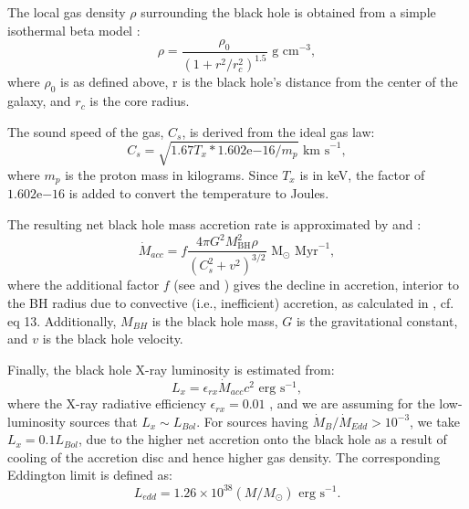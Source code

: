 \documentclass[fleqn,usenatbib,useAMS]{mnras}
\newcommand{\expnumber}[2]{{#1}\mathrm{e}{#2}}
\begin{document}
The local gas density ${\rho}$ surrounding the black hole is obtained from a simple isothermal beta model \citep{1962AJ.....67..471K, 1976A&A....49..137C, 1978A&A....70..677C}:
\begin{equation} \label{beta_model}
    \rho = \frac{\rho_0}{(1+r^2/r_c^2)^{1.5}} \text{  g cm}^{-3},
\end{equation}
where $\rho_0$ is as defined above, r is the black hole's distance from the center of the galaxy, and $r_c$ is the core radius.

The sound speed of the gas, $C_s$, is derived from the ideal gas law:
\begin{equation}\label{gas_sound_speed}
    C_s = \sqrt{1.67T_x*\expnumber{1.602}{-16}/m_p} \text{  km s}^{-1},
\end{equation}
where $m_p$ is the proton mass in kilograms.  Since $T_x$ is in keV, the factor of $\expnumber{1.602}{-16}$ is added to convert the temperature to Joules.

The resulting net black hole mass accretion rate is approximated by \citet{1944MNRAS.104..273B} and \citet{1952MNRAS.112..195B}:
\begin{equation}\label{net_accretion}
    \dot{M}_{acc} = f\frac{4{\pi}G^2M_\mathrm{BH}^2\rho}{(C_s^2+v^2)^{3/2}} \text{  M}_\odot \text{ Myr}^{-1},
\end{equation}
where the additional factor $f$ (see \cite{2018MNRAS.476.1412I} and \cite{2019MNRAS.486.5377I}) gives the decline in accretion, interior to the BH radius due to convective (i.e., inefficient) accretion, as calculated in \citet{2019MNRAS.486.5377I}, cf. eq 13.  Additionally, $M_{BH}$ is the black hole mass, $G$ is the gravitational constant, and $v$ is the black hole velocity.

Finally, the black hole X-ray luminosity is estimated from:
\begin{equation}
    L_x = \epsilon_{rx}\dot{M}_{acc}c^2 \text{  erg s}^{-1},
\end{equation}
where the X-ray radiative efficiency ${\epsilon}_{rx}=0.01$ , and we are assuming for the low-luminosity sources that $L_x{\sim}L_{Bol}$.  For sources having $\dot{M}_B/\dot{M}_{Edd} > 10^{-3}$, we take $L_x=0.1L_{Bol}$, due to the higher net accretion onto the black hole as a result of cooling of the accretion disc and hence higher gas density.
The corresponding Eddington limit is defined as:
\begin{equation}
    L_{edd} = 1.26 \times 10^{38} (M/M_{\odot}) \text{  erg s}^{-1}.
\end{equation}
\end{document}
